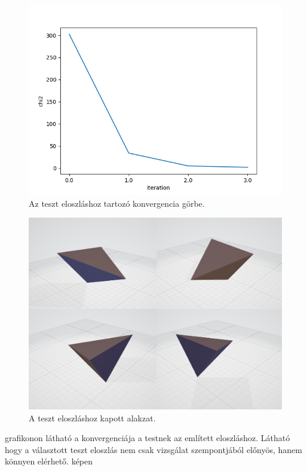 \begin{figure}[h!]
	\centering
	\includegraphics[scale=0.7]{images/tetrahedron_01.png}
	\caption{Az teszt eloszláshoz tartozó konvergencia görbe.}
	\label{fig:tetra01}
\end{figure}

\begin{figure}[h!]
	\centering
	\includegraphics[width=\textwidth]{images/tetra01obj.png}
	\caption{A teszt eloszláshoz kapott alakzat.}
	\label{fig:tetra01obj}
\end{figure}

 grafikonon látható a konvergenciája a testnek az említett eloszláshoz.
Látható hogy a választott teszt eloszlás nem csak vizsgálat szempontjából előnyös, hanem könnyen elérhető.
 képen 

